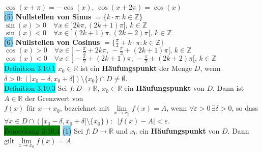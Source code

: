 \documentclass[10pt]{article}
\begin{document}
                \textcolor{NavyBlue}{$\cos(x+\pi)=-\cos(x),\,\cos(x+2\pi)=\cos(x)$}\\
        \indent \colorbox{SkyBlue}{(5)} \textbf{Nullstellen von Sinus} 
                \textcolor{NavyBlue}{$=\{k\cdot\pi:k\in\mathbb{Z}\}$} \qquad
                \textcolor{NavyBlue}{
                $\sin(x)>0\quad\forall x\in]2k\pi,(2k+1)\pi[,\,k\in\mathbb{Z}$}\\
        \indent\indent \textcolor{NavyBlue}{
                $\sin(x)<0\quad\forall x\in](2k+1)\pi,(2k+2)\pi[,\,k\in\mathbb{Z}$} \\
        \indent \colorbox{SkyBlue}{(6)} \textbf{Nullstellen von Cosinus}
                \textcolor{NavyBlue}{$=\{\frac{\pi}{2}+k\cdot\pi:k\in\mathbb{Z}\}$}
                \textcolor{NavyBlue}{$\cos(x)>0\quad
                \forall x\in]-\frac{\pi}{2}+2k\pi,\,-\frac{\pi}{2}+(2k+1)\pi[,\,
                k\in\mathbb{Z}$} \\
        \indent\indent \textcolor{NavyBlue}{$\cos(x)<0\quad
                \forall x\in]-\frac{\pi}{2}+(2k+1)\pi,\,-\frac{\pi}{2}+(2k+2)\pi[,\,
                k\in\mathbb{Z}$}\\
\colorbox{cyan}{Definition 3.10.1} \textcolor{NavyBlue}{$x_0\in\mathbb{R}$} 
                ist ein \textbf{Häufungspunkt} 
                der Menge \textcolor{NavyBlue}{$D$}, wenn \textcolor{NavyBlue}{
                $\delta>0:(]x_0-\delta,x_0+\delta[)\setminus\{x_0\}\cap D\neq\emptyset$}.\\ 
\colorbox{cyan}{Definition 3.10.3} Sei 
                \textcolor{NavyBlue}{$f:D\longrightarrow\mathbb{R},\,x_0\in\mathbb{R}$}
                ein \textbf{Häufungspunkt} von \textcolor{NavyBlue}{$D$}.
                Dann ist \textcolor{NavyBlue}{$A\in\mathbb{R}$} der Grenzwert von \\
        \indent \textcolor{NavyBlue}{$f(x)$} für \textcolor{NavyBlue}{$x\to x_0$}, 
                bezeichnet mit \textcolor{NavyBlue}{$\lim\limits_{x\to x_0}f(x)=A$}, 
                wenn \textcolor{NavyBlue}{$\forall\varepsilon>0\,\exists\delta>0$}, so dass \\
        \indent \textcolor{NavyBlue}{
                $\forall x\in D\cap(]x_0-\delta,x_0+\delta[\setminus\{x_0\}):\enspace
                |f(x)-A|<\varepsilon$}.\\
\colorbox{green}{Bemerkung 3.10.4} \colorbox{SkyBlue}{(1)} Sei 
                \textcolor{NavyBlue}{$f:D\longrightarrow\mathbb{R}$} und 
                \textcolor{NavyBlue}{$x_0$} ein \textbf{Häufungspunkt} von $D$. 
                Dann gilt \textcolor{NavyBlue}{$\lim\limits_{x\to x_0}f(x)=A$} 
\end{document}
